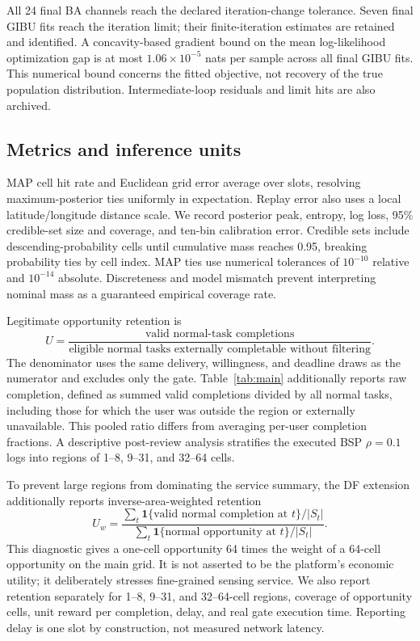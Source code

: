 \documentclass[review,12pt]{elsarticle}
\newcommand{\ind}{\mathbf{1}}
\begin{document}
All 24 final BA channels reach the declared iteration-change tolerance. Seven final GIBU fits reach the iteration limit; their finite-iteration estimates are retained and identified. A concavity-based gradient bound on the mean log-likelihood optimization gap is at most $1.06\times10^{-5}$ nats per sample across all final GIBU fits. This numerical bound concerns the fitted objective, not recovery of the true population distribution. Intermediate-loop residuals and limit hits are also archived.

\subsection{Metrics and inference units}
MAP cell hit rate and Euclidean grid error average over slots, resolving maximum-posterior ties uniformly in expectation. Replay error also uses a local latitude/longitude distance scale. We record posterior peak, entropy, log loss, 95\% credible-set size and coverage, and ten-bin calibration error. Credible sets include descending-probability cells until cumulative mass reaches 0.95, breaking probability ties by cell index. MAP ties use numerical tolerances of $10^{-10}$ relative and $10^{-14}$ absolute. Discreteness and model mismatch prevent interpreting nominal mass as a guaranteed empirical coverage rate.

Legitimate opportunity retention is
\begin{equation}
 U=\frac{\text{valid normal-task completions}}{\text{eligible normal tasks externally completable without filtering}}.
 \label{eq:utility}
\end{equation}
The denominator uses the same delivery, willingness, and deadline draws as the numerator and excludes only the gate. Table~\ref{tab:main} additionally reports raw completion, defined as summed valid completions divided by all normal tasks, including those for which the user was outside the region or externally unavailable. This pooled ratio differs from averaging per-user completion fractions. A descriptive post-review analysis stratifies the executed BSP $\rho=0.1$ logs into regions of 1--8, 9--31, and 32--64 cells.

To prevent large regions from dominating the service summary, the DF extension additionally reports inverse-area-weighted retention
\begin{equation}
 U_w=\frac{\sum_t \ind\{\text{valid normal completion at }t\}/|S_t|}
 {\sum_t \ind\{\text{normal opportunity at }t\}/|S_t|}.
 \label{eq:weighted-utility}
\end{equation}
This diagnostic gives a one-cell opportunity 64 times the weight of a 64-cell opportunity on the main grid. It is not asserted to be the platform's economic utility; it deliberately stresses fine-grained sensing service. We also report retention separately for 1--8, 9--31, and 32--64-cell regions, coverage of opportunity cells, unit reward per completion, delay, and real gate execution time. Reporting delay is one slot by construction, not measured network latency.
\end{document}
